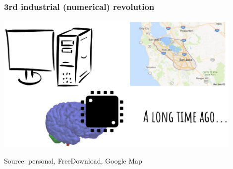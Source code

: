 \begin{frame}
\frametitle{3rd industrial (numerical) revolution}
\vskip 1.1cm
\begin{center}
    \includegraphics[width=0.9\textwidth]{./pictures/computer-microprocessor.png}
\end{center}
\vskip 0.3cm
\tiny{Source: personal, FreeDownload, Google Map}

\end{frame}


